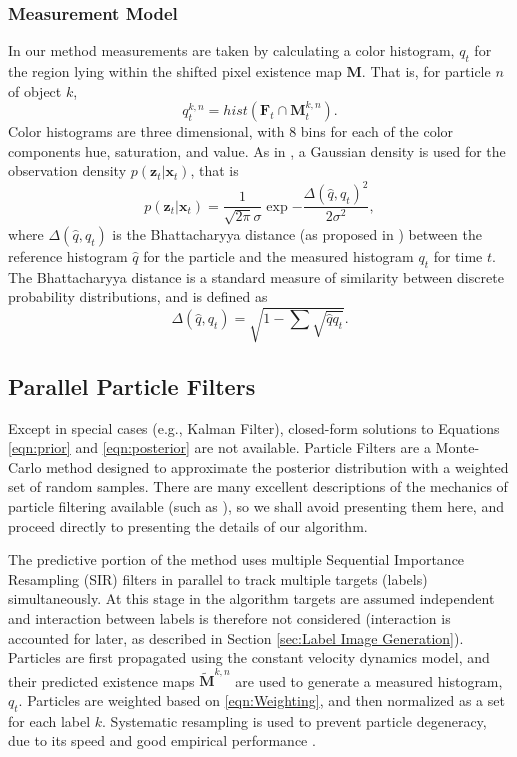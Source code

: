 \subsubsection{Measurement Model}
In our method measurements are taken by calculating a color histogram, $\mathit{q}_t$ for the region lying within the shifted pixel existence map $\mathbf{M}$. That is, for particle $n$ of object $k$,
\begin{equation}
\mathit{q}^{k,n}_t = hist( \mathbf{F}_{t} \cap \mathbf{M}^{k,n}_t ).
\end{equation}
Color histograms are three dimensional, with 8 bins for each of the color components hue, saturation, and value. As in \cite{ColorBasedProbabilisticTracking}, a Gaussian density is used for the observation density $\mathit{p}(\mathbf{z}_t|\mathbf{x}_{t})$, that is
\begin{equation} 
\label{eqn:Weighting}
\mathit{p}(\mathbf{z}_t|\mathbf{x}_{t}) = \frac{1}{\sqrt{2\pi}\sigma} \exp{-\frac{\Delta(\hat{\mathit{q}},\mathit{q}_t)^2}{2\sigma^2}}, 
\end{equation}
where $\Delta(\mathit{\hat{q}},\mathit{q}_t)$ is the Bhattacharyya distance (as proposed in \cite{Real-timeTrackingMeanShift}) between the reference histogram $\mathit{\hat{q}}$ for the particle and the measured histogram $\mathit{q}_t$ for time $\mathit{t}$. The Bhattacharyya distance is a standard measure of similarity between discrete probability distributions, and is defined as
\begin{equation} \Delta(\hat{\mathit{q}},\mathit{q}_t) = \sqrt{1- \sum{\sqrt{\hat{\mathit{q}}\mathit{q}_t }}}. \end{equation}

\subsection{Parallel Particle Filters}
Except in special cases (e.g., Kalman Filter), closed-form solutions to Equations \eqref{eqn:prior} and \eqref{eqn:posterior} are not available. Particle Filters are a Monte-Carlo method designed to approximate the posterior distribution with a weighted set of random samples. There are many excellent descriptions of the mechanics of particle filtering available (such as \cite{Doucet2001}), so we shall avoid presenting them here, and proceed directly to presenting the details of our algorithm. 

The predictive portion of the method uses multiple Sequential Importance Resampling (SIR) filters in parallel to track multiple targets (labels) simultaneously. At this stage in the algorithm targets are assumed independent and interaction between labels is therefore not considered (interaction is accounted for later, as described in Section \ref{sec:Label Image Generation}). Particles are first propagated using the constant velocity dynamics model, and their predicted existence maps $\tilde{\mathbf{M}}^{k,n}$ are used to generate a measured histogram, $\mathit{q}_t$. Particles are weighted based on \eqref{eqn:Weighting}, and then normalized as a set for each label $k$. Systematic resampling is used to prevent particle degeneracy, due to its speed and good empirical performance \cite{Doucet2001}.

